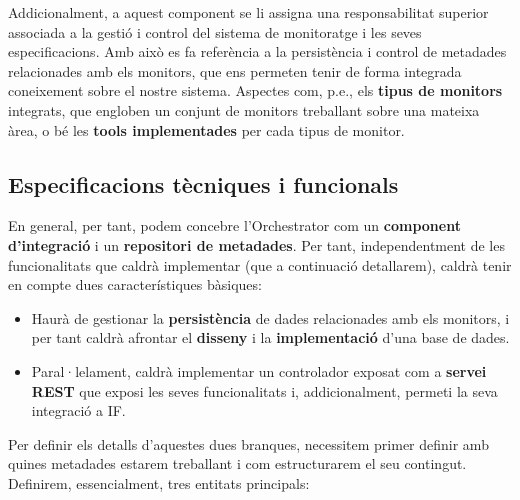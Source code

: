 Addicionalment, a aquest component se li assigna una responsabilitat superior associada a la gestió i control del sistema de monitoratge i les seves especificacions. Amb això es fa referència a la persistència i control de metadades relacionades amb els monitors, que ens permeten tenir de forma integrada coneixement sobre el nostre sistema. Aspectes com, p.e., els \textbf{tipus de monitors} integrats, que engloben un conjunt de monitors treballant sobre una mateixa àrea, o bé les \textbf{tools implementades} per cada tipus de monitor.\\

\subsection{Especificacions tècniques i funcionals}

En general, per tant, podem concebre l'Orchestrator com un \textbf{component d'integració} i un \textbf{repositori de metadades}. Per tant, independentment de les funcionalitats que caldrà implementar (que a continuació detallarem), caldrà tenir en compte dues característiques bàsiques:

\begin{itemize}
\item Haurà de gestionar la \textbf{persistència} de dades relacionades amb els monitors, i per tant caldrà afrontar el \textbf{disseny} i la \textbf{implementació} d'una base de dades.
\item Paral·lelament, caldrà implementar un controlador exposat com a \textbf{servei REST} que exposi les seves funcionalitats i, addicionalment, permeti la seva integració a IF.
\end{itemize}

Per definir els detalls d'aquestes dues branques, necessitem primer definir amb quines metadades estarem treballant i com estructurarem el seu contingut. Definirem, essencialment, tres entitats principals:

